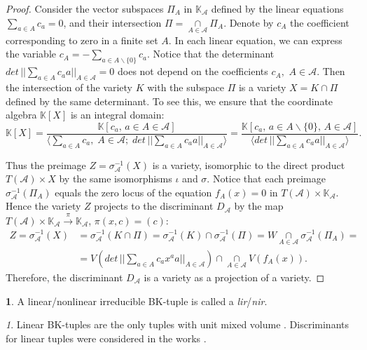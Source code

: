 \documentclass[11pt]{article}
\theoremstyle{plain}
\theoremstyle{definition}
\newtheorem{defn}[thm]{\protect\definitionname}
\theoremstyle{remark}
\newtheorem{rem}[thm]{\protect\remarkname}
\theoremstyle{plain}
\theoremstyle{plain}
\theoremstyle{plain}
\theoremstyle{definition}
\providecommand{\definitionname}{Definition}
\providecommand{\remarkname}{Remark}
\begin{document}
\begin{proof}
Consider the vector subspaces $\Pi_{A}$ in $\mathbb{K}_{\mathscr{A}}$
defined by the linear equations $\underset{a\in A}{\sum}c_{a}=0$,
and their intersection $\Pi=\underset{A\in\mathscr{A}}{\cap}\Pi_{A}$.
Denote by $c_{A}$ the coefficient corresponding to zero in a finite
set $A$. In each linear equation, we can express the variable $c_{A}=-\underset{a\in A\backslash\{0\}}{\sum}c_{a}.$
Notice that the determinant $det\,||\underset{a\in A}{\sum}c_{a}a||_{A\in\mathscr{A}}=0$
does not depend on the coefficients $c_{A},$ $A\in\mathscr{A}$.
Then the intersection of the variety $K$ with the subspace $\Pi$
is a variety $X=K\cap\Pi$ defined by the same determinant. To see
this, we ensure that the coordinate algebra $\mathbb{K}[X]$ is an
integral domain:
\[
\mathbb{K}[X]=\frac{\mathbb{K}[c_{a},\,a\in A\in\mathscr{A}]}{\langle\underset{a\in A}{\sum}c_{a},\;A\in\mathscr{A};\;det\,||\underset{a\in A}{\sum}c_{a}a||_{A\in\mathscr{A}}\rangle}=\frac{\mathbb{K}[c_{a},\,a\in A\backslash\{0\},\,A\in\mathscr{A}]}{\langle det\,||\underset{a\in A}{\sum}c_{a}a||_{A\in\mathscr{A}}\rangle}.
\]

Thus the preimage $Z=\sigma_{\mathscr{A}}^{-1}(X)$ is a variety,
isomorphic to the direct product $T(\mathscr{A})\times X$ by the
same isomorphisms $\iota$ and $\sigma$. Notice that each preimage
$\sigma_{\mathscr{A}}^{-1}(\Pi_{A})$ equals the zero locus of the
equation $f_{A}(x)=0$ in $T(\mathscr{A})\times\mathbb{K}_{\mathscr{A}}$.
Hence the variety $Z$ projects to the discriminant $D_{\mathscr{A}}$
by the map $T(\mathscr{A})\times\mathbb{K}_{\mathscr{A}}\overset{\pi}{\rightarrow}\mathbb{K}_{\mathscr{A}}$,
$\pi(x,c)=(c)$:
\begin{align*}
Z=\sigma_{\mathscr{A}}^{-1}(X) & =\sigma_{\mathscr{A}}^{-1}(K\cap\Pi)=\sigma_{\mathscr{A}}^{-1}(K)\cap\sigma_{\mathscr{A}}^{-1}(\Pi)=W\underset{A\in\mathscr{A}}{\cap}\sigma_{\mathscr{A}}^{-1}(\Pi_{A})=\\
 & =V(det\,||\underset{a\in A}{\sum}c_{a}x^{a}a||_{A\in\mathscr{A}})\cap\underset{A\in\mathscr{A}}{\cap}V(f_{A}(x)).
\end{align*}
Therefore, the discriminant $D_{\mathscr{A}}$ is a variety as a projection
of a variety.
\end{proof}
\begin{defn}
A linear/nonlinear irreducible BK-tuple is called a \textit{lir}/\textit{nir}.
\end{defn}

\begin{rem}
Linear BK-tuples are the only tuples with unit mixed volume \cite{cattani_mixed_2013,esterov_systems_2015}.
Discriminants for linear tuples were considered in the works \cite{esterov_galois_2019,borger_defectivity_2020}.
\end{rem}
\end{document}
